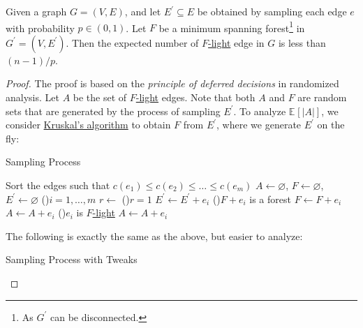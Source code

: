\begin{lemma}\label{lma:sampling}
	Given a graph \(G=(V, E)\), and let \(E^{\prime} \subseteq E\) be obtained by sampling each edge \(e\) with probability \(p \in (0, 1)\). Let \(F\) be a minimum spanning forest\footnote{As \(G^{\prime} \) can be disconnected.} in \(G^{\prime} = (V, E^{\prime}) \). Then the expected number of \hyperref[def:light]{\(F\)-light} edge in \(G\) is less than \((n-1) / p\).
\end{lemma}
\begin{proof}
	The proof is based on the \emph{principle of deferred decisions} in randomized analysis. Let \(A\) be the set of \hyperref[def:light]{\(F\)-light} edges. Note that both \(A\) and \(F\) are random sets that are generated by the process of sampling \(E^{\prime} \). To analyze \(\mathbb{E}_{}[\lvert A \rvert ] \), we consider \hyperref[algo:Kruskal]{Kruskal's algorithm} to obtain \(F\) from \(E^{\prime} \), where we generate \(E^{\prime} \) on the fly:

	\begin{algorithm}[H]
		\DontPrintSemicolon
		\caption{Sampling Process}
		\BlankLine

		Sort the edges such that \(c(e_1) \leq c(e_2) \leq \dots \leq c(e_m)\)\;
		\(A \gets \varnothing \), \(F \gets \varnothing \), \(E^{\prime} \gets \varnothing \)\;
		\For(){\(i = 1, \dots , m\)}{
			\(r \gets\)
			\uIf(){\(r = 1\)}{
				\(E^{\prime} \gets E^{\prime} + e_i\)\;
				\If(){\(F + e_i\) is a forest}{
					\(F \gets F + e_i\)\;
					\(A \gets A + e_i\)\;
				}
			}
			\ElseIf(){\(e_i\) is \hyperref[def:light]{\(F\)-light}}{
				\(A \gets A + e_i\)\;
			}
		}
		\;
	\end{algorithm}

	The following is exactly the same as the above, but easier to analyze:

	\begin{algorithm}[H]
		\DontPrintSemicolon
		\caption{Sampling Process with Tweaks}
		\BlankLine


\end{algorithm}
\end{proof}
